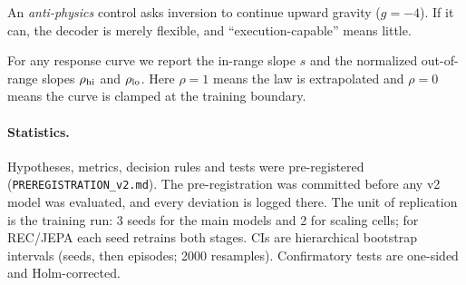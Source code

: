 An \emph{anti-physics} control asks inversion to continue upward gravity ($g{=}-4$). If it can, the
decoder is merely flexible, and ``execution-capable'' means little.

For any response curve we report the in-range slope $s$ and the normalized out-of-range slopes
$\rho_{\rm hi}$ and $\rho_{\rm lo}$. Here $\rho{=}1$ means the law is extrapolated and $\rho{=}0$
means the curve is clamped at the training boundary.

\paragraph{Statistics.} Hypotheses, metrics, decision rules and tests were pre-registered
(\texttt{PREREGISTRATION\_v2.md}). The pre-registration was committed before any v2 model was
evaluated, and every deviation is logged there. The unit of replication is the training run: 3 seeds
for the main models and 2 for scaling cells; for REC/JEPA each seed retrains both stages. CIs are
hierarchical bootstrap intervals (seeds, then episodes; 2000 resamples). Confirmatory tests are
one-sided and Holm-corrected.
